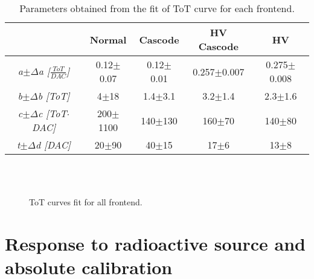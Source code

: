 \begin{table}[h!]
\centering
\begin{tabular}{c|c|c|c|c}
 & \textbf{Normal} & \textbf{Cascode} & \textbf{HV Cascode} & \textbf{HV} \\
\hline
\textit{a$\pm\Delta$a [$\frac{ToT}{DAC}$]} & 0.12$\pm$0.07 & 0.12$\pm$0.01 & 0.257$\pm$0.007 & 0.275$\pm$0.008 \\
\textit{b$\pm\Delta$b [ToT]} & 4$\pm$18 & 1.4$\pm$3.1 & 3.2$\pm$1.4 & 2.3$\pm$1.6 \\
\textit{c$\pm\Delta$c [ToT$\cdot$DAC]} & 200$\pm$1100 & 140$\pm$130 & 160$\pm$70 & 140$\pm$80 \\
\textit{t$\pm\Delta$d [DAC]} & 20$\pm$90 & 40$\pm$15 & 17$\pm$6 & 13$\pm$8 \\
\end{tabular}
\caption{Parameters obtained from the fit of ToT curve for each frontend.}
\label{tab:th_fe}
\end{table}

\begin{figure}[h!]
\centering
{}\quad
{}\\
\quad
{}\\
\caption{ToT curves fit for all frontend.}
\label{fig:tot_fe}
\end{figure}


\section{Response to radioactive source and absolute calibration} \label{sec:source_ana}


